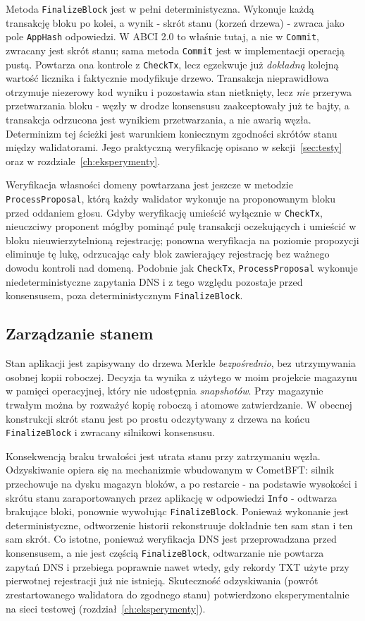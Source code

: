 Metoda \texttt{FinalizeBlock} jest w pełni deterministyczna. Wykonuje każdą transakcję bloku po kolei, a wynik - skrót stanu (korzeń drzewa) - zwraca jako pole \texttt{AppHash} odpowiedzi. W ABCI 2.0 to właśnie tutaj, a nie w \texttt{Commit}, zwracany jest skrót stanu; sama metoda \texttt{Commit} jest w implementacji operacją pustą. Powtarza ona kontrole z \texttt{CheckTx}, lecz egzekwuje już \emph{dokładną} kolejną wartość licznika i faktycznie modyfikuje drzewo. Transakcja nieprawidłowa otrzymuje niezerowy kod wyniku i pozostawia stan nietknięty, lecz \emph{nie} przerywa przetwarzania bloku - węzły w drodze konsensusu zaakceptowały już te bajty, a transakcja odrzucona jest wynikiem przetwarzania, a nie awarią węzła. Determinizm tej ścieżki jest warunkiem koniecznym zgodności skrótów stanu między walidatorami. Jego praktyczną weryfikację opisano w sekcji~\ref{sec:testy} oraz w rozdziale~\ref{ch:eksperymenty}.

Weryfikacja własności domeny powtarzana jest jeszcze w metodzie \texttt{ProcessProposal}, którą każdy walidator wykonuje na proponowanym bloku przed oddaniem głosu. Gdyby weryfikację umieścić wyłącznie w \texttt{CheckTx}, nieuczciwy proponent mógłby pominąć pulę transakcji oczekujących i umieścić w bloku nieuwierzytelnioną rejestrację; ponowna weryfikacja na poziomie propozycji eliminuje tę lukę, odrzucając cały blok zawierający rejestrację bez ważnego dowodu kontroli nad domeną. Podobnie jak \texttt{CheckTx}, \texttt{ProcessProposal} wykonuje niedeterministyczne zapytania DNS i z tego względu pozostaje przed konsensusem, poza deterministycznym \texttt{FinalizeBlock}.

\subsection{Zarządzanie stanem}
\label{subsec:zarzadzanie-stanem}

Stan aplikacji jest zapisywany do drzewa Merkle \emph{bezpośrednio}, bez utrzymywania osobnej kopii roboczej. Decyzja ta wynika z użytego w moim projekcie magazynu w pamięci operacyjnej, który nie udostępnia \emph{snapshotów}. Przy magazynie trwałym można by rozważyć kopię roboczą i atomowe zatwierdzanie. W obecnej konstrukcji skrót stanu jest po prostu odczytywany z drzewa na końcu \texttt{FinalizeBlock} i zwracany silnikowi konsensusu.

Konsekwencją braku trwałości jest utrata stanu przy zatrzymaniu węzła. Odzyskiwanie opiera się na mechanizmie wbudowanym w CometBFT: silnik przechowuje na dysku magazyn bloków, a po restarcie - na podstawie wysokości i skrótu stanu zaraportowanych przez aplikację w odpowiedzi \texttt{Info} - odtwarza brakujące bloki, ponownie wywołując \texttt{FinalizeBlock}. Ponieważ wykonanie jest deterministyczne, odtworzenie historii rekonstruuje dokładnie ten sam stan i ten sam skrót. Co istotne, ponieważ weryfikacja DNS jest przeprowadzana przed konsensusem, a nie jest częścią \texttt{FinalizeBlock}, odtwarzanie nie powtarza zapytań DNS i przebiega poprawnie nawet wtedy, gdy rekordy TXT użyte przy pierwotnej rejestracji już nie istnieją. Skuteczność odzyskiwania (powrót zrestartowanego walidatora do zgodnego stanu) potwierdzono eksperymentalnie na sieci testowej (rozdział~\ref{ch:eksperymenty}).


